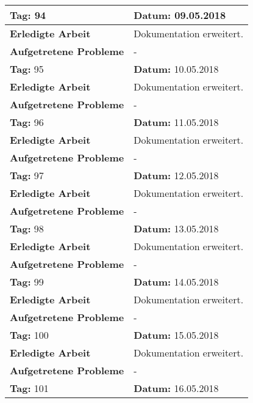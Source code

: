 \begin{longtable}{|p{5cm}|p{5cm}p{6cm}|}
\rowcolor{heading}\textbf{Tag:} 94 & \textbf{Datum:} 09.05.2018 & \\ \hline
\textbf{Erledigte Arbeit} & \multicolumn{2}{p{11cm}|}{Dokumentation erweitert.} \\ \hline
\textbf{Aufgetretene Probleme} & \multicolumn{2}{p{11cm}|}{-} \\ \hline
\rowcolor{heading}\textbf{Tag:} 95 & \textbf{Datum:} 10.05.2018 & \\ \hline
\textbf{Erledigte Arbeit} & \multicolumn{2}{p{11cm}|}{Dokumentation erweitert.} \\ \hline
\textbf{Aufgetretene Probleme} & \multicolumn{2}{p{11cm}|}{-} \\ \hline
\rowcolor{heading}\textbf{Tag:} 96 & \textbf{Datum:} 11.05.2018 & \\ \hline
\textbf{Erledigte Arbeit} & \multicolumn{2}{p{11cm}|}{Dokumentation erweitert.} \\ \hline
\textbf{Aufgetretene Probleme} & \multicolumn{2}{p{11cm}|}{-} \\ \hline
\rowcolor{heading}\textbf{Tag:} 97 & \textbf{Datum:} 12.05.2018 & \\ \hline
\textbf{Erledigte Arbeit} & \multicolumn{2}{p{11cm}|}{Dokumentation erweitert.} \\ \hline
\textbf{Aufgetretene Probleme} & \multicolumn{2}{p{11cm}|}{-} \\ \hline
\rowcolor{heading}\textbf{Tag:} 98 & \textbf{Datum:} 13.05.2018 & \\ \hline
\textbf{Erledigte Arbeit} & \multicolumn{2}{p{11cm}|}{Dokumentation erweitert.} \\ \hline
\textbf{Aufgetretene Probleme} & \multicolumn{2}{p{11cm}|}{-} \\ \hline
\rowcolor{heading}\textbf{Tag:} 99 & \textbf{Datum:} 14.05.2018 & \\ \hline
\textbf{Erledigte Arbeit} & \multicolumn{2}{p{11cm}|}{Dokumentation erweitert.} \\ \hline
\textbf{Aufgetretene Probleme} & \multicolumn{2}{p{11cm}|}{-} \\ \hline
\rowcolor{heading}\textbf{Tag:} 100 & \textbf{Datum:} 15.05.2018 & \\ \hline
\textbf{Erledigte Arbeit} & \multicolumn{2}{p{11cm}|}{Dokumentation erweitert.} \\ \hline
\textbf{Aufgetretene Probleme} & \multicolumn{2}{p{11cm}|}{-} \\ \hline
\rowcolor{heading}\textbf{Tag:} 101 & \textbf{Datum:} 16.05.2018 & \\ \hline

\end{longtable}
